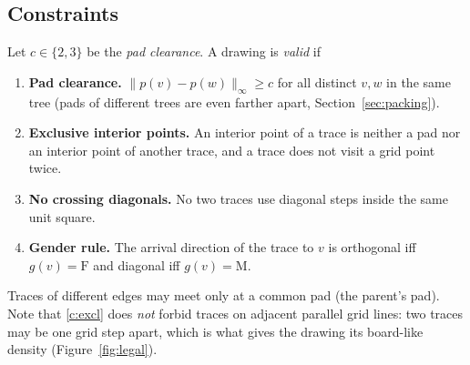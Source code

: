 \documentclass[11pt,a4paper]{article}
\theoremstyle{remark}
\newcommand{\pos}{p}
\newcommand{\cheb}[1]{\lVert #1 \rVert_\infty}
\begin{document}
\subsection{Constraints}
Let $c\in\{2,3\}$ be the \emph{pad clearance}. A drawing is \emph{valid} if
\begin{enumerate}[label=(C\arabic*),leftmargin=3.2em]
  \item\label{c:pad} \textbf{Pad clearance.} $\cheb{\pos(v)-\pos(w)}\ge c$ for all distinct $v,w$ in the same tree
        (pads of different trees are even farther apart, Section~\ref{sec:packing}).
  \item\label{c:excl} \textbf{Exclusive interior points.} An interior point of a trace is neither a pad nor an
        interior point of another trace, and a trace does not visit a grid point twice.
  \item\label{c:diag} \textbf{No crossing diagonals.} No two traces use diagonal steps inside the same unit square.
  \item\label{c:gender} \textbf{Gender rule.} The arrival direction of the trace to $v$ is orthogonal iff
        $g(v)=\mathrm F$ and diagonal iff $g(v)=\mathrm M$.
\end{enumerate}
Traces of different edges may meet only at a common pad (the parent's pad). Note that \ref{c:excl} does \emph{not}
forbid traces on adjacent parallel grid lines: two traces may be one grid step apart, which is what gives the
drawing its board-like density (Figure~\ref{fig:legal}).
\end{document}

